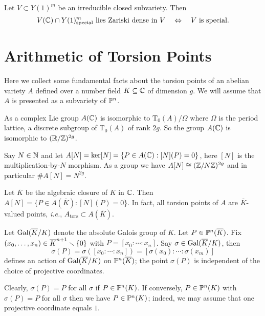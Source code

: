 \begin{theorem}
  \label{thm:ao}
  Let $V\subset Y(1)^m$ be an irreducible closed subvariety. Then
  \begin{equation*}
    V({\mathbb{C}}) \cap Y(1)^m_{\mathrm{special}} \text{ lies Zariski dense in
      $V$}\quad\Leftrightarrow \quad
    \text{$V$ is special.}
  \end{equation*}    
\end{theorem}

\section{Arithmetic of Torsion Points}
\label{sec:galoistorsionav}

Here we collect some fundamental facts about the torsion points of an
abelian variety $A$ defined over a number field $K\subseteq {\mathbb{C}}$ of dimension $g$. We will
assume that $A$ is presented as a subvariety of ${\mathbb{P}}^n$. 

As a complex Lie group $A({\mathbb{C}})$ is isomorphic to
$\mathrm{T}_0(A)/\Omega$ where $\Omega$ is the period lattice, a
discrete subgroup of $\mathrm{T}_0(A)$ of rank $2g$. So the group
$A({\mathbb{C}})$ is isomorphic to $({\mathbb{R}}/{\mathbb{Z}})^{2g}$.

Say $N\in{\mathbb{N}}$ and let $A[N] =  \ker[N] = \{P\in A({\mathbb{C}}) : [N](P) = 0\}$, here
$[N]$ is the multiplication-by-$N$ morphism.
As a group we have $A[N] \cong ({\mathbb{Z}}/N{\mathbb{Z}})^{2g}$ and in particular
$\#A[N] = N^{2g}$.

Let $\overline K$ be the algebraic closure of $K$ in ${\mathbb{C}}$.
Then $A[N] = \{P\in A(\overline K) : [N](P)=0\}$. In fact, all torsion
points of $A$ are $\overline K$-valued points, \textit{i.e.},
$A_{\mathrm{tors}}\subset A(\overline K)$. 

Let $\mathrm{Gal}(\overline{K}/K)$ denote the absolute Galois group of $K$. Let
$P\in {\mathbb{P}}^n(\overline{K})$. Fix  $(x_0,\ldots,x_n) \in
\overline{K}^{n+1}\smallsetminus\{0\}$ with
 $P=[x_0:\cdots:x_n]$. Say $\sigma\in \mathrm{Gal}(\overline{K}/K)$, then
\begin{equation*}
\sigma(P)=  \sigma([x_0:\cdots:x_n]) = [\sigma(x_0):\cdots:\sigma(x_m)]
\end{equation*}
defines an action of $\mathrm{Gal}(\overline{K}/K)$ on ${\mathbb{P}}^n(\overline K)$; the point
$\sigma(P)$ is independent of the choice of projective coordinates. 

Clearly, $\sigma(P)=P$ for all $\sigma$ if $P\in {\mathbb{P}}^n( K)$. If
conversely, $P\in {\mathbb{P}}^n(K)$ with $\sigma(P)=P$ for all $\sigma$ then
we have $P\in {\mathbb{P}}^n(K)$; indeed, we may assume that one projective
coordinate equals $1$.

